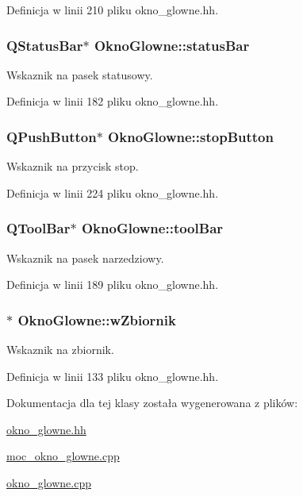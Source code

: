Definicja w linii 210 pliku okno\-\_\-glowne.\-hh.

\hypertarget{class_okno_glowne_a40a10989bc6b318ac24e2457d7adb53b}{
\subsubsection[{status\-Bar}]{\setlength{\rightskip}{0pt plus 5cm}Q\-Status\-Bar$\ast$ Okno\-Glowne\-::status\-Bar}}\label{class_okno_glowne_a40a10989bc6b318ac24e2457d7adb53b}
Wskaznik na pasek statusowy. 

Definicja w linii 182 pliku okno\-\_\-glowne.\-hh.

\hypertarget{class_okno_glowne_a3051d73dc0e0a27dc30ada43cc6b63c4}{
\subsubsection[{stop\-Button}]{\setlength{\rightskip}{0pt plus 5cm}Q\-Push\-Button$\ast$ Okno\-Glowne\-::stop\-Button}}\label{class_okno_glowne_a3051d73dc0e0a27dc30ada43cc6b63c4}
Wskaznik na przycisk stop. 

Definicja w linii 224 pliku okno\-\_\-glowne.\-hh.

\hypertarget{class_okno_glowne_a6a37dd1f32605092fff7feac712bf429}{
\subsubsection[{tool\-Bar}]{\setlength{\rightskip}{0pt plus 5cm}Q\-Tool\-Bar$\ast$ Okno\-Glowne\-::tool\-Bar}}\label{class_okno_glowne_a6a37dd1f32605092fff7feac712bf429}
Wskaznik na pasek narzedziowy. 

Definicja w linii 189 pliku okno\-\_\-glowne.\-hh.

\hypertarget{class_okno_glowne_af2d1275209898ebdd5ab9de8ef78dffd}{
\subsubsection[{w\-Zbiornik}]{$\ast$ Okno\-Glowne\-::w\-Zbiornik}}\label{class_okno_glowne_af2d1275209898ebdd5ab9de8ef78dffd}
Wskaznik na zbiornik. 

Definicja w linii 133 pliku okno\-\_\-glowne.\-hh.



Dokumentacja dla tej klasy została wygenerowana z plików\-:\begin{DoxyCompactItemize}
\item 
\hyperlink{okno__glowne_8hh}{okno\-\_\-glowne.\-hh}\item 
\hyperlink{moc__okno__glowne_8cpp}{moc\-\_\-okno\-\_\-glowne.\-cpp}\item 
\hyperlink{okno__glowne_8cpp}{okno\-\_\-glowne.\-cpp}\end{DoxyCompactItemize}
